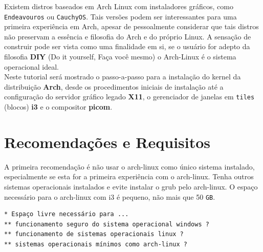\documentclass[12pt,a4paper]{article}
\begin{document}
Existem distros baseados em Arch Linux com instaladores gráficos, como \texttt{Endeavouros} ou \texttt{CauchyOS}. Tais versões podem ser interessantes para uma primeira experiência em Arch, apesar de pessoalmente considerar que tais distros não preservam a essência e filosofia do Arch e do próprio Linux. A sensação de construir pode ser vista como uma finalidade em si, se o usuário for adepto da filosofia \textbf{DIY} (Do it yourself, Faça você mesmo) o Arch-Linux é o sistema operacional ideal. \\


Neste tutorial será mostrado o passo-a-passo para a instalação do kernel da distribuição \textbf{Arch}, desde os procedimentos iniciais de instalação até a configuração do servidor gráfico legado \textbf{X11}, o gerenciador de janelas em \texttt{tiles} (blocos) \textbf{i3} e o compositor \textbf{picom}.

\section{Recomendações e Requisitos}

\hspace{\baselineskip}

A primeira recomendação é não usar o arch-linux como único sistema instalado, especialmente se esta for a primeira experiência com o arch-linux. Tenha outros sistemas operacionais instalados e evite instalar o grub pelo arch-linux. O espaço necessário para o arch-linux com i3 é pequeno, não mais que 50 \texttt{GB}. \\

\begin{lstlisting}
* Espaço livre necessário para ...
** funcionamento seguro do sistema operacional windows ?
** funcionamento de sistemas operacionais linux ? 
** sistemas operacionais mínimos como arch-linux ? 
\end{lstlisting}
\end{document}
